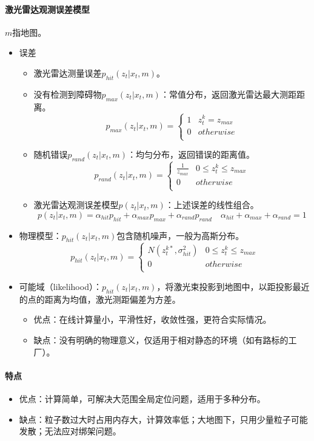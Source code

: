 \documentclass[
12pt, %
a4paper, 
oneside, %
headinclude,footinclude, %
]{scrartcl}
\begin{document}
\paragraph{激光雷达观测误差模型}
$ m $指地图。
\begin{itemize}
\item 误差
\begin{itemize}
\item 激光雷达测量误差$ p_{hit}(z_t|x_t, m) $。
\item 没有检测到障碍物$ p_{max}(z_t|x_t, m) $：常值分布，返回激光雷达最大测距距离。
$$
p_{max}(z_t|x_t, m) = \begin{cases}
1 & z_t^k = z_{max} \\
0 & otherwise \\
\end{cases}
$$
\item 随机错误$ p_{rand}(z_t|x_t,m) $：均匀分布，返回错误的距离值。
$$
p_{rand}(z_t|x_t, m) = \begin{cases}
\frac{1}{z_{max}} & 0 \leq z_t^k \leq z_{max} \\
0 & otherwise \\
\end{cases}
$$
\item 激光雷达观测误差模型$ p(z_t|x_t, m) $：上述误差的线性组合。
$$ p(z_t|x_t, m) = \alpha_{hit}p_{hit} + \alpha_{max}p_{max} + \alpha_{rand}p_{rand} \quad \alpha_{hit} + \alpha_{max} + \alpha_{rand} = 1 $$
\end{itemize}
\item 物理模型：$ p_{hit}(z_t|x_t, m) $包含随机噪声，一般为高斯分布。
$$
p_{hit}(z_t|x_t, m) = \begin{cases}
N(z_t^{k*}, \sigma_{hit}^2) & 0 \leq z_t^k \leq z_{max} \\
0 & otherwise \\
\end{cases}
$$
\item 可能域（likelihood）：$ p_{hit}(z_t|x_t, m) $，将激光束投影到地图中，以距投影最近的点的距离为均值，激光测距偏差为方差。
\begin{itemize}
\item 优点：在线计算量小，平滑性好，收敛性强，更符合实际情况。
\item 缺点：没有明确的物理意义，仅适用于相对静态的环境（如有路标的工厂）。
\end{itemize}
\end{itemize}
\paragraph{特点}
\begin{itemize}
\item 优点：计算简单，可解决大范围全局定位问题，适用于多种分布。
\item 缺点：粒子数过大时占用内存大，计算效率低；大地图下，只用少量粒子可能发散；无法应对绑架问题。
\end{itemize}
\end{document}
